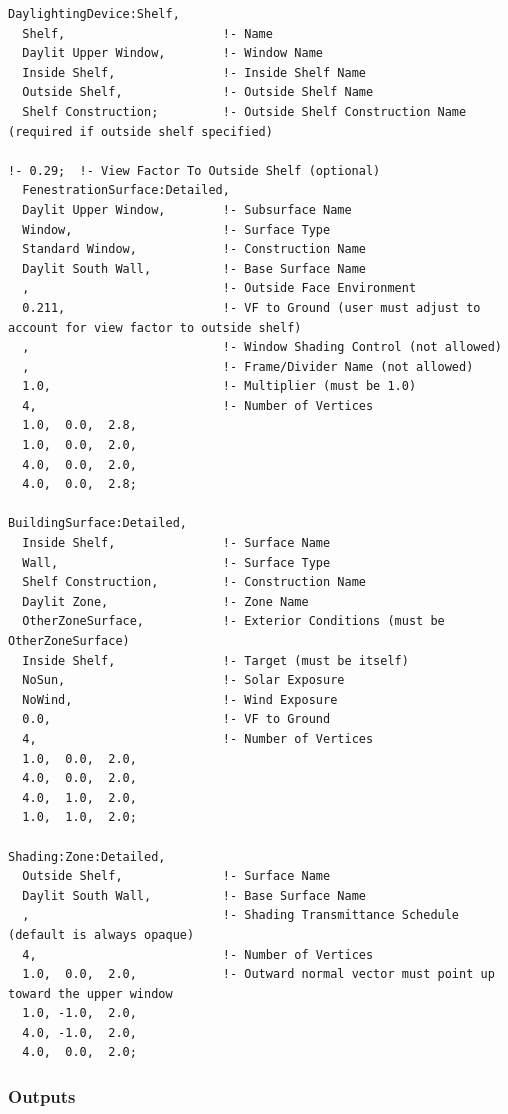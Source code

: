 \begin{lstlisting}
DaylightingDevice:Shelf,
  Shelf,                      !- Name
  Daylit Upper Window,        !- Window Name
  Inside Shelf,               !- Inside Shelf Name
  Outside Shelf,              !- Outside Shelf Name
  Shelf Construction;         !- Outside Shelf Construction Name (required if outside shelf specified)

!- 0.29;  !- View Factor To Outside Shelf (optional)
  FenestrationSurface:Detailed,
  Daylit Upper Window,        !- Subsurface Name
  Window,                     !- Surface Type
  Standard Window,            !- Construction Name
  Daylit South Wall,          !- Base Surface Name
  ,                           !- Outside Face Environment
  0.211,                      !- VF to Ground (user must adjust to account for view factor to outside shelf)
  ,                           !- Window Shading Control (not allowed)
  ,                           !- Frame/Divider Name (not allowed)
  1.0,                        !- Multiplier (must be 1.0)
  4,                          !- Number of Vertices
  1.0,  0.0,  2.8,
  1.0,  0.0,  2.0,
  4.0,  0.0,  2.0,
  4.0,  0.0,  2.8;

BuildingSurface:Detailed,
  Inside Shelf,               !- Surface Name
  Wall,                       !- Surface Type
  Shelf Construction,         !- Construction Name
  Daylit Zone,                !- Zone Name
  OtherZoneSurface,           !- Exterior Conditions (must be OtherZoneSurface)
  Inside Shelf,               !- Target (must be itself)
  NoSun,                      !- Solar Exposure
  NoWind,                     !- Wind Exposure
  0.0,                        !- VF to Ground
  4,                          !- Number of Vertices
  1.0,  0.0,  2.0,
  4.0,  0.0,  2.0,
  4.0,  1.0,  2.0,
  1.0,  1.0,  2.0;

Shading:Zone:Detailed,
  Outside Shelf,              !- Surface Name
  Daylit South Wall,          !- Base Surface Name
  ,                           !- Shading Transmittance Schedule (default is always opaque)
  4,                          !- Number of Vertices
  1.0,  0.0,  2.0,            !- Outward normal vector must point up toward the upper window
  1.0, -1.0,  2.0,
  4.0, -1.0,  2.0,
  4.0,  0.0,  2.0;
\end{lstlisting}

\subsubsection{Outputs}\label{outputs-3-002}

